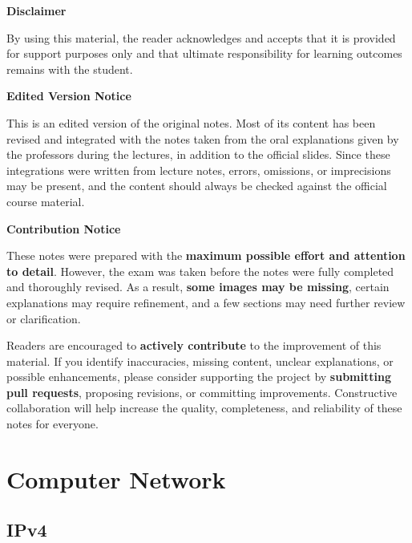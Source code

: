 \documentclass[11pt,a4paper,openany]{report}
\begin{document}
\begin{notebox}
\textbf{Disclaimer}\par
By using this material, the reader acknowledges and accepts that it is provided for support purposes only and that ultimate responsibility for learning outcomes remains with the student.
\end{notebox}

\begin{notebox}
	\textbf{Edited Version Notice}\par
	This is an edited version of the original notes. Most of its content has been revised and integrated with the notes taken from the oral explanations given by the professors during the lectures, in addition to the official slides. Since these integrations were written from lecture notes, errors, omissions, or imprecisions may be present, and the content should always be checked against the official course material.
\end{notebox}

\begin{notebox}
\textbf{Contribution Notice}\par
These notes were prepared with the \textbf{maximum possible effort and attention to detail}. However, the exam was taken before the notes were fully completed and thoroughly revised. As a result, \textbf{some images may be missing}, certain explanations may require refinement, and a few sections may need further review or clarification.
\end{notebox}

\begin{notebox}
Readers are encouraged to \textbf{actively contribute} to the improvement of this material. If you identify inaccuracies, missing content, unclear explanations, or possible enhancements, please consider supporting the project by \textbf{submitting pull requests}, proposing revisions, or committing improvements. Constructive collaboration will help increase the quality, completeness, and reliability of these notes for everyone.
\end{notebox}
\clearpage
{}
\hypersetup{pageanchor=true}



\part{Computer Network}

\chapter{IPv4}
\end{document}
